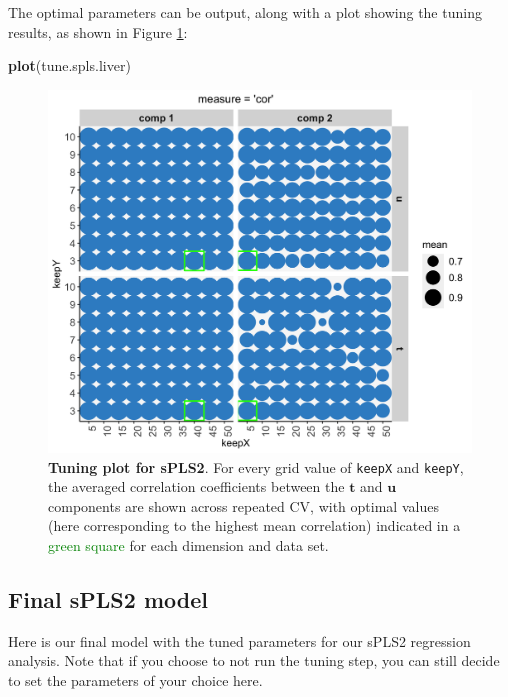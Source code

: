 \documentclass[]{book}
\newenvironment{Shaded}{\begin{snugshade}}{\end{snugshade}}
\newcommand{\KeywordTok}[1]{\textcolor[rgb]{0.13,0.29,0.53}{\textbf{#1}}}
\newcommand{\NormalTok}[1]{#1}
\begin{document}
The optimal parameters can be output, along with a plot showing the tuning results, as shown in Figure \ref{fig:spls2-tune}:

\begin{Shaded}
\begin{Highlighting}[]
\KeywordTok{plot}\NormalTok{(tune.spls.liver)}
\end{Highlighting}
\end{Shaded}

\begin{figure}

{\centering \includegraphics[width=0.6\linewidth]{Figures/PLS/spls2-tune-1} 

}

\caption{\textbf{Tuning plot for sPLS2}. For every grid value of \texttt{keepX} and \texttt{keepY}, the averaged correlation coefficients between the \(\boldsymbol t\) and \(\boldsymbol u\) components are shown across repeated CV, with optimal values (here corresponding to the highest mean correlation) indicated in a \textcolor{green}{green square} for each dimension and data set.}\label{fig:spls2-tune}
\end{figure}



\hypertarget{final-spls2}{%
\subsection{Final sPLS2 model}\label{final-spls2}}

Here is our final model with the tuned parameters for our sPLS2 regression analysis. Note that if you choose to not run the tuning step, you can still decide to set the parameters of your choice here.
\end{document}
